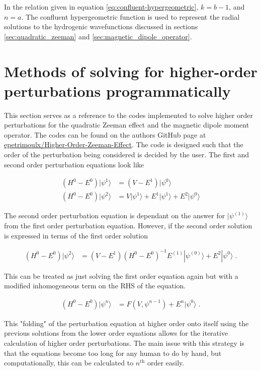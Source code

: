         \noindent In the relation given in equation \eqref{eq:confluent-hypergeometric}, $k = {b-1}$, and $n = a$. The confluent hypergeometric function is used to represent the radial solutions to the hydrogenic wavefunctions discussed in sections \ref{sec:quadratic_zeeman} and \ref{sec:magnetic_dipole_operator}.


\chapter{Methods of solving for higher-order perturbations programmatically} \label{sec:Program_perturbation}
    This section serves as a reference to the codes implemented to solve higher order perturbations for the quadratic Zeeman effect and the magnetic dipole moment operator. The codes can be found on the authors GitHub page at \href{https://github.com/epetrimoulx/Quadratic-Zeeman-Effect}{epetrimoulx/Higher-Order-Zeeman-Effect}. The code is designed such that the order of the perturbation being considered is decided by the user. The first and second order perturbation equations look like 

    \begin{align}
        \left( H^0 - E^0 \right) \vert \psi^{1}\rangle &= \left( V - E^{1}\right) \vert \psi^{0} \rangle \\
        \left( H^0 - E^0 \right) \vert \psi^{2}\rangle &= V \vert \psi^{1}\rangle + E^{1} \vert \psi^{1} \rangle + E^{2} \vert \psi^{0} \rangle
    \end{align}

    \noindent The second order perturbation equation is dependant on the answer for $\vert \psi^{(1)} \rangle$ from the first order perturbation equation. However, if the second order solution is expressed in terms of the first order solution

    \begin{align}
        \left( H^0 - E^0 \right) \vert \psi^{2}\rangle &= \left(V - E^{1}\right) (H^0 - E^0)^{-1} E^{(1)} |\psi^{(0)}\rangle + E^{2} |\psi^{0}\rangle\;.
    \end{align}

    \noindent This can be treated as just solving the first order equation again but with a modified inhomogeneous term on the RHS of the equation. 
    
    \begin{align}
        \left( H^0 - E^0 \right) \vert \psi^{n} \rangle &= F(V, \psi^{n-1}) + E^{n} \vert \psi^{0} \rangle\;.
    \end{align}

    \noindent This "folding" of the perturbation equation at higher order onto itself using the previous solutions from the lower order equations allows for the iterative calculation of higher order perturbations. The main issue with this strategy is that the equations become too long for any human to do by hand, but computationally, this can be calculated to $n^\text{th}$ order easily. 

